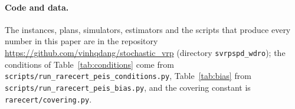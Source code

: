 \documentclass[11pt]{article}
\theoremstyle{definition}
\theoremstyle{remark}
\begin{document}
{\sloppy\paragraph{Code and data.} The instances, plans, simulators, estimators and the scripts
that produce every number in this paper are in the repository
\url{https://github.com/vinhqdang/stochastic_vrp} (directory \texttt{svrpspd\_wdro}); the
conditions of Table~\ref{tab:conditions} come from
\texttt{scripts/run\_rarecert\_peis\_conditions.py}, Table~\ref{tab:bias} from
\texttt{scripts/run\_rarecert\_peis\_bias.py}, and the covering constant is
\texttt{rarecert/covering.py}.\par}



\end{document}
